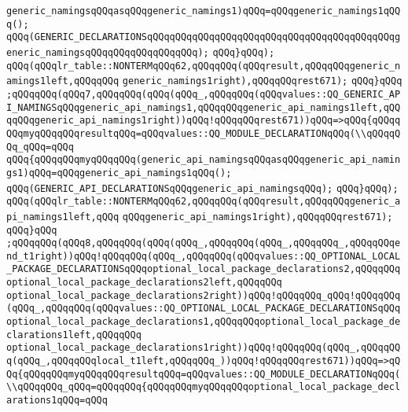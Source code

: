 \verb|generic_namingsqQQqasqQQqgeneric_namings1)qQQq=qQQqgeneric_namings1qQQq();|\newline
\verb|qQQq(GENERIC_DECLARATIONSqQQqqQQqqQQqqQQqqQQqqQQqqQQqqQQqqQQqqQQqqQQqgeneric_namingsqQQqqQQqqQQqqQQqqQQq);|\newline
\verb|qQQq}qQQq);|\newline
\verb|qQQq(qQQqlr_table::NONTERMqQQq62,qQQqqQQq(qQQqresult,qQQqqQQqgeneric_namings1left,qQQqqQQq|\newline
\verb|generic_namings1right),qQQqqQQqrest671);|\newline
\verb|qQQq}qQQq|\newline
\verb|;qQQqqQQq(qQQq7,qQQqqQQq(qQQq(qQQq_,qQQqqQQq(qQQqvalues::QQ_GENERIC_API_NAMINGSqQQqgeneric_api_namings1,qQQqqQQqgeneric_api_namings1left,qQQqqQQqgeneric_api_namings1right))qQQq!qQQqqQQqrest671))qQQq=>qQQq{qQQqqQQqmyqQQqqQQqresultqQQq=qQQqvalues::QQ_MODULE_DECLARATIONqQQq(\\qQQqqQQq_qQQq=qQQq|\newline
\verb|qQQq{qQQqqQQqmyqQQqqQQq(generic_api_namingsqQQqasqQQqgeneric_api_namings1)qQQq=qQQqgeneric_api_namings1qQQq();|\newline
\verb|qQQq(GENERIC_API_DECLARATIONSqQQqgeneric_api_namingsqQQq);|\newline
\verb|qQQq}qQQq);|\newline
\verb|qQQq(qQQqlr_table::NONTERMqQQq62,qQQqqQQq(qQQqresult,qQQqqQQqgeneric_api_namings1left,qQQq|\newline
\verb|qQQqgeneric_api_namings1right),qQQqqQQqrest671);|\newline
\verb|qQQq}qQQq|\newline
\verb|;qQQqqQQq(qQQq8,qQQqqQQq(qQQq(qQQq_,qQQqqQQq(qQQq_,qQQqqQQq_,qQQqqQQqend_t1right))qQQq!qQQqqQQq(qQQq_,qQQqqQQq(qQQqvalues::QQ_OPTIONAL_LOCAL_PACKAGE_DECLARATIONSqQQqoptional_local_package_declarations2,qQQqqQQqoptional_local_package_declarations2left,qQQqqQQq|\newline
\verb|optional_local_package_declarations2right))qQQq!qQQqqQQq_qQQq!qQQqqQQq(qQQq_,qQQqqQQq(qQQqvalues::QQ_OPTIONAL_LOCAL_PACKAGE_DECLARATIONSqQQqoptional_local_package_declarations1,qQQqqQQqoptional_local_package_declarations1left,qQQqqQQq|\newline
\verb|optional_local_package_declarations1right))qQQq!qQQqqQQq(qQQq_,qQQqqQQq(qQQq_,qQQqqQQqlocal_t1left,qQQqqQQq_))qQQq!qQQqqQQqrest671))qQQq=>qQQq{qQQqqQQqmyqQQqqQQqresultqQQq=qQQqvalues::QQ_MODULE_DECLARATIONqQQq(\\qQQqqQQq_qQQq=qQQqqQQq{qQQqqQQqmyqQQqqQQqoptional_local_package_declarations1qQQq=qQQq|\newline
